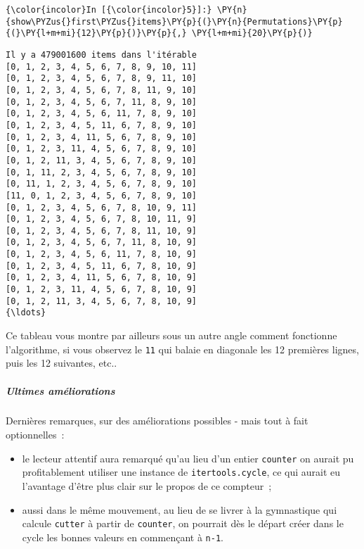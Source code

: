     \begin{Verbatim}[commandchars=\\\{\},frame=single,framerule=0.3mm,rulecolor=\color{cellframecolor}]
{\color{incolor}In [{\color{incolor}5}]:} \PY{n}{show\PYZus{}first\PYZus{}items}\PY{p}{(}\PY{n}{Permutations}\PY{p}{(}\PY{l+m+mi}{12}\PY{p}{)}\PY{p}{,} \PY{l+m+mi}{20}\PY{p}{)}
\end{Verbatim}


    \begin{Verbatim}[commandchars=\\\{\},frame=single,framerule=0.3mm,rulecolor=\color{cellframecolor}]
Il y a 479001600 items dans l'itérable
[0, 1, 2, 3, 4, 5, 6, 7, 8, 9, 10, 11]
[0, 1, 2, 3, 4, 5, 6, 7, 8, 9, 11, 10]
[0, 1, 2, 3, 4, 5, 6, 7, 8, 11, 9, 10]
[0, 1, 2, 3, 4, 5, 6, 7, 11, 8, 9, 10]
[0, 1, 2, 3, 4, 5, 6, 11, 7, 8, 9, 10]
[0, 1, 2, 3, 4, 5, 11, 6, 7, 8, 9, 10]
[0, 1, 2, 3, 4, 11, 5, 6, 7, 8, 9, 10]
[0, 1, 2, 3, 11, 4, 5, 6, 7, 8, 9, 10]
[0, 1, 2, 11, 3, 4, 5, 6, 7, 8, 9, 10]
[0, 1, 11, 2, 3, 4, 5, 6, 7, 8, 9, 10]
[0, 11, 1, 2, 3, 4, 5, 6, 7, 8, 9, 10]
[11, 0, 1, 2, 3, 4, 5, 6, 7, 8, 9, 10]
[0, 1, 2, 3, 4, 5, 6, 7, 8, 10, 9, 11]
[0, 1, 2, 3, 4, 5, 6, 7, 8, 10, 11, 9]
[0, 1, 2, 3, 4, 5, 6, 7, 8, 11, 10, 9]
[0, 1, 2, 3, 4, 5, 6, 7, 11, 8, 10, 9]
[0, 1, 2, 3, 4, 5, 6, 11, 7, 8, 10, 9]
[0, 1, 2, 3, 4, 5, 11, 6, 7, 8, 10, 9]
[0, 1, 2, 3, 4, 11, 5, 6, 7, 8, 10, 9]
[0, 1, 2, 3, 11, 4, 5, 6, 7, 8, 10, 9]
[0, 1, 2, 11, 3, 4, 5, 6, 7, 8, 10, 9]
{\ldots}
\end{Verbatim}

    Ce tableau vous montre par ailleurs sous un autre angle comment
fonctionne l'algorithme, si vous observez le \texttt{11} qui balaie en
diagonale les 12 premières lignes, puis les 12 suivantes, etc..

    \hypertarget{ultimes-amuxe9liorations}{%
\subparagraph{Ultimes améliorations}\label{ultimes-amuxe9liorations}}

    Dernières remarques, sur des améliorations possibles - mais tout à fait
optionnelles~:

\begin{itemize}
\tightlist
\item
  le lecteur attentif aura remarqué qu'au lieu d'un entier
  \texttt{counter} on aurait pu profitablement utiliser une instance de
  \texttt{itertools.cycle}, ce qui aurait eu l'avantage d'être plus
  clair sur le propos de ce compteur~;
\item
  aussi dans le même mouvement, au lieu de se livrer à la gymnastique
  qui calcule \texttt{cutter} à partir de \texttt{counter}, on pourrait
  dès le départ créer dans le cycle les bonnes valeurs en commençant à
  \texttt{n-1}.
\end{itemize}

